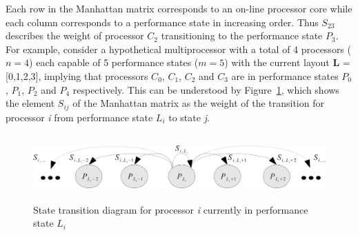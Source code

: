 Each row in the Manhattan matrix corresponds to an on-line processor core while each column corresponds to a performance state
in increasing order. Thus $S_{23}$ describes the weight of processor $C_2$ transitioning to the performance state $P_3$. 
For example, consider a hypothetical multiprocessor with a total of 4 processors ($n = 4$) each capable of
5 performance states ($m = 5$) with the current layout \textbf{L} = [0,1,2,3], implying that processors $C_0$, $C_1$, $C_2$ and $C_3$
are in performance states $P_0$, $P_1$, $P_2$ and $P_4$ respectively. This can be understood by Figure~\ref{fig:state_transition},
which shows the element $S_{ij}$ of the Manhattan matrix as the weight of the transition for processor \textit{i}
from performance state $L_i$ to state \textit{j}. 

\begin{figure}[h!]
  \begin{center}
    \includegraphics[height=1in]{figures/StateTransition.jpg}
    \caption{State transition diagram for processor \textit{i} currently in performance state $L_i$}
    \label{fig:state_transition}
  \end{center}
\end{figure}


